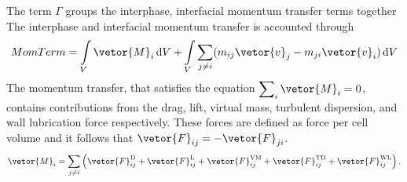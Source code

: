 The term $\Gamma$ groups the interphase, interfacial momentum transfer
 terms together
The interphase and interfacial momentum transfer is accounted through
\begin{equation}
    MomTerm =  \int\limits_{V} \vetor{M}_{i}\,\mathrm{d}V 
    + \int\limits_{V} \sum_{j \neq i} (m_{ij}\vetor{v}_{j} - m_{ji}\vetor{v}_{i})\,\mathrm{d}V
\end{equation}
The momentum transfer, that satisfies the equation $\displaystyle \sum\nolimits_{i}\vetor{M}_{i} = 0$,
 contains contributions from the drag, lift, virtual mass, turbulent dispersion, and wall lubrication force
 respectively. These forces are defined as force per cell volume and it follows that
 $\vetor{F}_{ij} = -\vetor{F}_{ji}$.
 \begin{equation}
    \vetor{M}_{i} = \sum_{j \neq i} \left(\vetor{F}_{ij}^{\mathrm{D}}
    + \vetor{F}_{ij}^{\mathrm{L}} + \vetor{F}_{ij}^{\mathrm{VM}} 
   + \vetor{F}_{ij}^{\mathrm{TD}} + \vetor{F}_{ij}^{\mathrm{WL}}\right).
 \end{equation}
